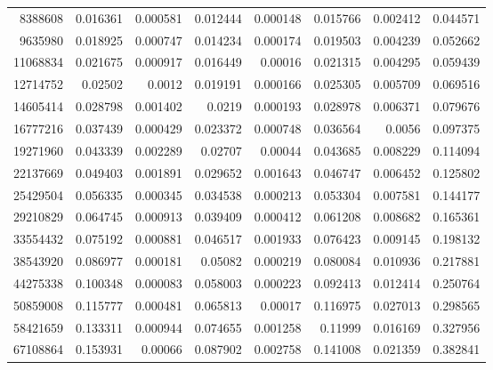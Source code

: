 \begin{tabular}{r r r r r r r r}
8388608 & 0.016361 & 0.000581 & 0.012444 & 0.000148 & 0.015766 & 0.002412 & 0.044571 \\
9635980 & 0.018925 & 0.000747 & 0.014234 & 0.000174 & 0.019503 & 0.004239 & 0.052662 \\
11068834 & 0.021675 & 0.000917 & 0.016449 & 0.00016 & 0.021315 & 0.004295 & 0.059439 \\
12714752 & 0.02502 & 0.0012 & 0.019191 & 0.000166 & 0.025305 & 0.005709 & 0.069516 \\
14605414 & 0.028798 & 0.001402 & 0.0219 & 0.000193 & 0.028978 & 0.006371 & 0.079676 \\
16777216 & 0.037439 & 0.000429 & 0.023372 & 0.000748 & 0.036564 & 0.0056 & 0.097375 \\
19271960 & 0.043339 & 0.002289 & 0.02707 & 0.00044 & 0.043685 & 0.008229 & 0.114094 \\
22137669 & 0.049403 & 0.001891 & 0.029652 & 0.001643 & 0.046747 & 0.006452 & 0.125802 \\
25429504 & 0.056335 & 0.000345 & 0.034538 & 0.000213 & 0.053304 & 0.007581 & 0.144177 \\
29210829 & 0.064745 & 0.000913 & 0.039409 & 0.000412 & 0.061208 & 0.008682 & 0.165361 \\
33554432 & 0.075192 & 0.000881 & 0.046517 & 0.001933 & 0.076423 & 0.009145 & 0.198132 \\
38543920 & 0.086977 & 0.000181 & 0.05082 & 0.000219 & 0.080084 & 0.010936 & 0.217881 \\
44275338 & 0.100348 & 0.000083 & 0.058003 & 0.000223 & 0.092413 & 0.012414 & 0.250764 \\
50859008 & 0.115777 & 0.000481 & 0.065813 & 0.00017 & 0.116975 & 0.027013 & 0.298565 \\
58421659 & 0.133311 & 0.000944 & 0.074655 & 0.001258 & 0.11999 & 0.016169 & 0.327956 \\
67108864 & 0.153931 & 0.00066 & 0.087902 & 0.002758 & 0.141008 & 0.021359 & 0.382841 \\
\end{tabular}
